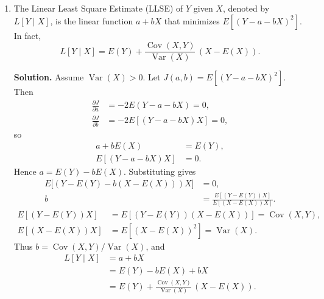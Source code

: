 \documentclass[11pt]{article}
\newcommand{\Var}{\operatorname{Var}}
\newcommand{\Cov}{\operatorname{Cov}}
\begin{document}
\begin{enumerate}[label=\arabic*., leftmargin=1.6em]
\begin{enumerate}
\textbf{Solution.}
\begin{align*}
E\bigl[(Y-E(Y\mid X))\bigl(E(Y\mid X)-E(Y)\bigr)\bigr]
&= E\Bigl[\bigl(E(Y\mid X)-E(Y)\bigr)\,E\bigl(Y-E(Y\mid X)\mid X\bigr)\Bigr] \\
&= 0.
\end{align*}
\begin{align*}
\Var(Y)
&= E\bigl[(Y-E(Y))^{2}\bigr] \\
&= E\bigl[\bigl((Y-E(Y\mid X))+(E(Y\mid X)-E(Y))\bigr)^{2}\bigr] \\
&= E\bigl[(Y-E(Y\mid X))^{2}\bigr] + E\bigl[(E(Y\mid X)-E(Y))^{2}\bigr] \\
&= E\bigl[E\bigl((Y-E(Y\mid X))^{2}\mid X\bigr)\bigr] + \Var\bigl(E(Y\mid X)\bigr) \\
&= E\bigl(\Var(Y\mid X)\bigr) + \Var\bigl(E(Y\mid X)\bigr).
\end{align*}

\newpage
\item The Linear Least Square Estimate (LLSE) of $Y$ given $X$, denoted by $L[Y\mid X]$, is
the linear function $a+bX$ that minimizes $E[(Y-a-bX)^{2}]$. In fact,
\[
L[Y\mid X] = E(Y) + \frac{\Cov(X,Y)}{\Var(X)}\,(X-E(X)).
\]

\textbf{Solution.}
Assume \(\Var(X)>0\). Let \(J(a,b)=E[(Y-a-bX)^{2}]\). Then
\begin{align*}
\frac{\partial J}{\partial a}
&= -2E(Y-a-bX)=0, \\
\frac{\partial J}{\partial b}
&= -2E[(Y-a-bX)X]=0,
\end{align*}
so
\begin{align*}
a+bE(X)&=E(Y), \\
E[(Y-a-bX)X]&=0.
\end{align*}
Hence \(a=E(Y)-bE(X)\). Substituting gives
\begin{align*}
E\bigl[(Y-E(Y)-b(X-E(X)))X\bigr]
&= 0, \\
b
&= \frac{E[(Y-E(Y))X]}{E[(X-E(X))X]}.
\end{align*}
\begin{align*}
E[(Y-E(Y))X]
&= E[(Y-E(Y))(X-E(X))]
= \Cov(X,Y), \\
E[(X-E(X))X]
&= E[(X-E(X))^{2}]
= \Var(X).
\end{align*}
Thus \(b=\Cov(X,Y)/\Var(X)\), and
\begin{align*}
L[Y\mid X]
&= a+bX \\
&= E(Y)-bE(X)+bX \\
&= E(Y)+\frac{\Cov(X,Y)}{\Var(X)}\,(X-E(X)).
\end{align*}


\end{enumerate}
\end{enumerate}
\end{document}
